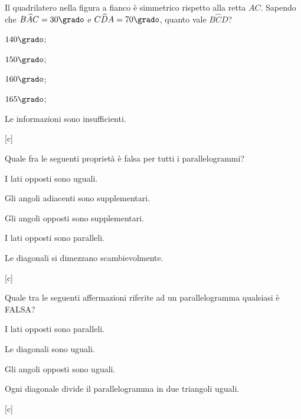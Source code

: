 \noindent\begin{minipage}{0.6\textwidth}\parindent15pt
\begin{esercizio}
\label{ese:4.60}
Il quadrilatero nella figura a fianco è simmetrico rispetto alla 
retta $AC$.
Sapendo che $B\widehat{A}C = 30\grado$ e $C\widehat{D}A = 70\grado$, 
quanto vale $B\widehat{C}D$?
\begin{enumeratea}
\item $140\grado$;
\item $150\grado$;
\item $160\grado$;
\item $165\grado$;
\item Le informazioni sono insufficienti.
\end{enumeratea}
\hfill[c]
\end{esercizio}
\end{minipage}\hfil
\begin{minipage}{0.4\textwidth}
	\centering
\end{minipage}

\begin{esercizio}
\label{ese:4.61}
Quale fra le seguenti proprietà è falsa per tutti i parallelogrammi?
\begin{enumeratea}
\item I lati opposti sono uguali.
\item Gli angoli adiacenti sono supplementari.
\item Gli angoli opposti sono supplementari.
\item I lati opposti sono paralleli.
\item Le diagonali si dimezzano scambievolmente.
\end{enumeratea}
\hfill[c]
\end{esercizio}

\begin{esercizio}
\label{ese:4.62}
Quale tra le seguenti affermazioni riferite ad un parallelogramma 
qualsiasi è FALSA?
\begin{enumeratea}
\item I lati opposti sono paralleli.
\item Le diagonali sono uguali.
\item Gli angoli opposti sono uguali.
\item Ogni diagonale divide il parallelogramma in due triangoli 
uguali.
\end{enumeratea}
\hfill[c]
\end{esercizio}

